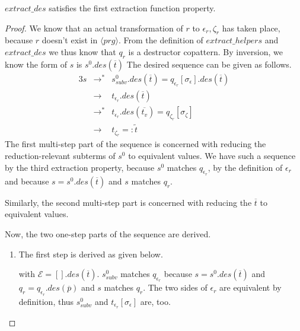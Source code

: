 \begin{lemma}

$extract\_des$ satisfies the first extraction function property.

\begin{proof}

We know that an actual transformation of $r$ to $\epsilon_r, \zeta_r$ has taken place, because $r$ doesn't exist in $\langle prg \rangle$. From the definition of $extract\_helpers$ and $extract\_des$ we thus know that $q_r$ is a destructor copattern. By inversion, we know the form of $s$ is $s^0.des(\overline{t})$ The desired sequence can be given as follows.
\begin{alignat*}{3}
s &\longrightarrow^* &s^0_{subv}.des(\overline{t}) = q_{\epsilon_r}[\sigma_\epsilon].des(\overline{t})\\
&\longrightarrow &t_{\epsilon_r}.des(\overline{t})\\
&\longrightarrow^*  &t_{\epsilon_r}.des(\overline{t_v}) = q_{\zeta_r}[\sigma_\zeta]\\
&\longrightarrow &t_{\zeta_r} =: \widetilde{t}
\end{alignat*}
The first multi-step part of the sequence is concerned with reducing the reduction-relevant subterms of $s^0$ to equivalent values. We have such a sequence by the third extraction property, because $s^0$ matches $q_{\epsilon_r}$, by the definition of $\epsilon_r$ and because $s = s^0.des(\overline{t})$ and $s$ matches $q_r$.

Similarly, the second multi-step part is concerned with reducing the $\overline{t}$ to equivalent values.

Now, the two one-step parts of the sequence are derived.
\begin{enumerate}
\item The first step is derived as given below.
\begin{prooftree}
\end{prooftree}
with $\mathcal{E} = [].des(\overline{t})$. $s^0_{subv}$ matches $q_{\epsilon_r}$ because $s = s^0.des(\overline{t})$ and $q_r = q_{\epsilon_r}.des(\overline{p})$ and $s$ matches $q_r$. The two sides of $\epsilon_r$ are equivalent by definition, thus $s^0_{subv}$ and $t_{\epsilon_r}[\sigma_\epsilon]$ are, too.


\end{enumerate}
\end{proof}
\end{lemma}
